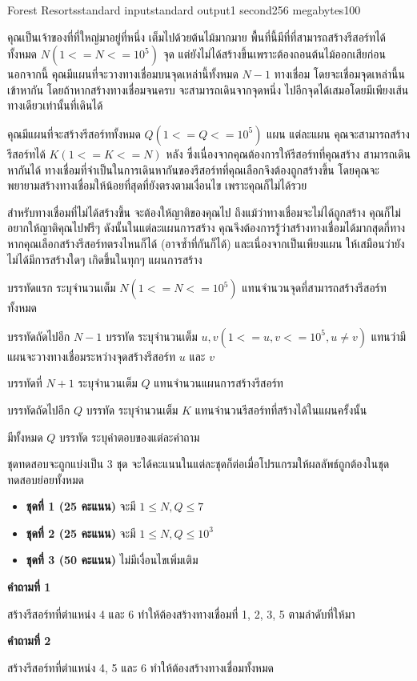 \documentclass[11pt,a4paper]{article}
\begin{document}
\begin{problem}{Forest Resorts}{standard input}{standard output}{1 second}{256 megabytes}{100}

คุณเป็นเจ้าของที่ที่ใหญ่มาอยู่ที่หนึ่ง เต็มไปด้วยต้นไม้มากมาย พื้นที่นี้มีที่ที่สามารถสร้างรีสอร์ทได้ทั้งหมด $N (1 <= N <= 10^5)$ จุด แต่ยังไม่ได้สร้างขึ้นเพราะต้องถอนต้นไม้ออกเสียก่อน นอกจากนี้ คุณมีแผนที่จะวางทางเชื่อมบนจุดเหล่านี้ทั้งหมด $N - 1$ ทางเชื่อม โดยจะเชื่อมจุดเหล่านี้นเข้าหากัน โดยถ้าหากสร้างทางเชื่อมจนครบ จะสามารถเดินจากจุดหนึ่ง ไปอีกจุดได้เสมอโดยมีเพียงเส้นทางเดียวเท่านั้นที่เดินได้

คุณมีแผนที่จะสร้างรีสอร์ททั้งหมด $Q (1 <= Q <= 10^5)$ แผน แต่ละแผน คุณจะสามารถสร้างรีสอร์ทได้ $K (1 <= K <= N)$ หลัง ซึ่งเนื่องจากคุณต้องการให้รีสอร์ทที่คุณสร้าง สามารถเดินหากันได้ ทางเชื่อมที่จำเป็นในการเดินหากันของรีสอร์ทที่คุณเลือกจึงต้องถูกสร้างขึ้น โดยคุณจะพยายามสร้างทางเชื่อมให้น้อยที่สุดที่ยังตรงตามเงื่อนไข เพราะคุณก็ไม่ได้รวย

สำหรับทางเชื่อมที่ไม่ได้สร้างขึ้น จะต้องให้ญาติของคุณไป ถึงแม้ว่าทางเชื่อมจะไม่ได้ถูกสร้าง คุณก็ไม่อยากให้ญาติคุณไปฟรีๆ ดังนั้นในแต่ละแผนการสร้าง คุณจึงต้องการรู้ว่าสร้างทางเชื่อมได้มากสุดกี่ทาง หากคุณเลือกสร้างรีสอร์ทตรงไหนก็ได้ (อาจซ้ำที่กันก็ได้) และเนื่องจากเป็นเพียงแผน ให้เสมือนว่ายังไม่ได้มีการสร้างใดๆ เกิดขึ้นในทุกๆ แผนการสร้าง

\InputFile
บรรทัดแรก ระบุจำนวนเต็ม $N (1 <= N <= 10^5)$ แทนจำนวนจุดที่สามารถสร้างรีสอร์ททั้งหมด

บรรทัดถัดไปอีก $N - 1$ บรรทัด ระบุจำนวนเต็ม $u, v (1 <= u, v <= 10^5, u \neq v)$ แทนว่ามีแผนจะวางทางเชื่อมระหว่างจุดสร้างรีสอร์ท $u$ และ $v$

บรรทัดที่ $N + 1$ ระบุจำนวนเต็ม $Q$ แทนจำนวนแผนการสร้างรีสอร์ท

บรรทัดถัดไปอีก $Q$ บรรทัด ระบุจำนวนเต็ม $K$ แทนจำนวนรีสอร์ทที่สร้างได้ในแผนครั้งนั้น

\OutputFile
มีทั้งหมด $Q$ บรรทัด ระบุคำตอบของแต่ละคำถาม

\Scoring
ชุดทดสอบจะถูกแบ่งเป็น 3 ชุด จะได้คะแนนในแต่ละชุดก็ต่อเมื่อโปรแกรมให้ผลลัพธ์ถูกต้องในชุดทดสอบย่อยทั้งหมด

\begin{itemize}
\item \textbf{ชุดที่ 1 (25 คะแนน)} จะมี $1 \leq N, Q\leq 7$

\item \textbf{ชุดที่ 2 (25 คะแนน)} จะมี $1 \leq N, Q\leq 10^3$

\item \textbf{ชุดที่ 3 (50 คะแนน)} ไม่มีเงื่อนไขเพิ่มเติม
\end{itemize}

\Example

\begin{example}
%
\end{example}

\Note
\textbf{คำถามที่ 1}

สร้างรีสอร์ทที่ตำแหน่ง 4 และ 6 ทำให้ต้องสร้างทางเชื่อมที่ 1, 2, 3, 5 ตามลำดับที่ให้มา

\textbf{คำถามที่ 2}

สร้างรีสอร์ทที่ตำแหน่ง 4, 5 และ 6 ทำให้ต้องสร้างทางเชื่อมทั้งหมด

\end{problem}
\end{document}
